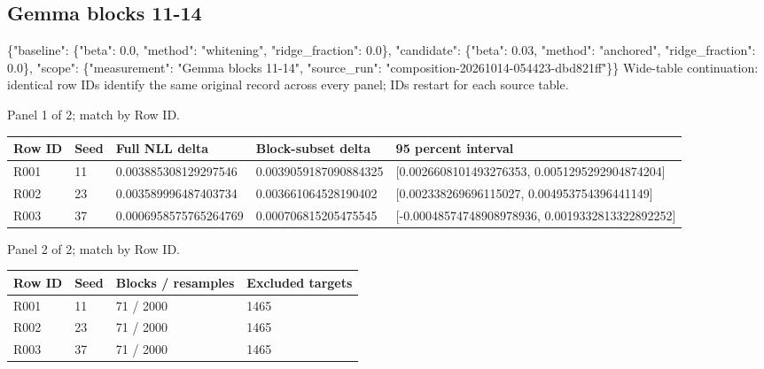 \documentclass[10pt]{article}
\begin{document}
\subsection{Gemma blocks 11-14}
\{"baseline": \{"beta": 0.0, "method": "whitening", "ridge\_fraction": 0.0\}, "candidate": \{"beta": 0.03, "method": "anchored", "ridge\_fraction": 0.0\}, "scope": \{"measurement": "Gemma blocks 11-14", "source\_run": "composition-20261014-054423-dbd821ff"\}\}
Wide-table continuation: identical row IDs identify the same original record across every panel; IDs restart for each source table.
\par\noindent Panel 1 of 2; match by Row ID.
{\scriptsize\setlength{\tabcolsep}{2pt}
\begin{longtable}{p{}p{}p{}p{}p{}}
Row ID & Seed & Full NLL delta & Block-subset delta & 95 percent interval \\
\hline\endhead
R001 & 11 & 0.003885308129297546 & 0.0039059187090884325 & [0.0026608101493276353, 0.0051295292904874204] \\
R002 & 23 & 0.003589996487403734 & 0.003661064528190402 & [0.002338269696115027, 0.004953754396441149] \\
R003 & 37 & 0.0006958575765264769 & 0.000706815205475545 & [-0.00048574748908978936, 0.0019332813322892252] \\
\end{longtable}}
\par\noindent Panel 2 of 2; match by Row ID.
{\scriptsize\setlength{\tabcolsep}{2pt}
\begin{longtable}{p{}p{}p{}p{}}
Row ID & Seed & Blocks / resamples & Excluded targets \\
\hline\endhead
R001 & 11 & 71 / 2000 & 1465 \\
R002 & 23 & 71 / 2000 & 1465 \\
R003 & 37 & 71 / 2000 & 1465 \\
\end{longtable}}
\end{document}
